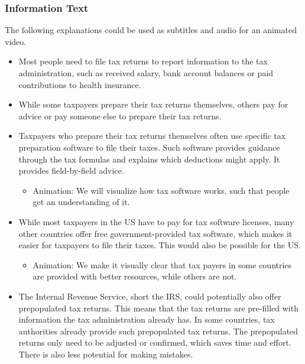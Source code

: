 \documentclass[11pt]{article}
\begin{document}
\subsubsection*{Information Text}
The following explanations could be used as subtitles and audio for an animated video.
\begin{itemize}
    \item Most people need to file tax returns to report information to the tax administration, such as received salary, bank account balances or paid contributions to health insurance.
    \item While some taxpayers prepare their tax returns themselves, others pay for advice or pay someone else to prepare their tax returns. 
    \item Taxpayers who prepare their tax returns themselves often use specific tax preparation software to file their taxes. Such software provides guidance through the tax formulas and explains which deductions might apply. It provides field-by-field advice.
    \begin{itemize}
        \item Animation: We will visualize how tax software works, such that people get an understanding of it. 
    \end{itemize}
    \item While most taxpayers in the US have to pay for tax software licenses, many other countries offer free government-provided tax software, which makes it easier for taxpayers to file their taxes. This would also be possible for the US. 
    \begin{itemize}
        \item Animation: We make it visually clear that tax payers in some countries are provided with better resources, while others are not. 
    \end{itemize}
    \item The Internal Revenue Service, short the IRS, could potentially also offer prepopulated tax returns. This means that the tax returns are pre-filled with information the tax administration already has. In some countries, tax authorities already provide such prepopulated tax returns. The prepopulated returns only need to be adjusted or confirmed, which saves time and effort. There is also less potential for making mistakes.

\end{itemize}
\end{document}

